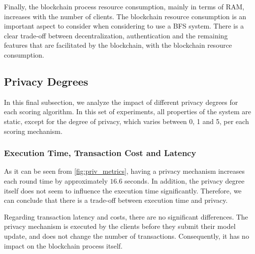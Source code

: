 Finally, the blockchain process resource consumption, mainly in terms of RAM, increases with the number of clients. The blockchain resource consumption is an important aspect to consider when considering to use a BFS system. There is a clear trade-off between decentralization, authentication and the remaining features that are facilitated by the blockchain, with the blockchain resource consumption.

\subsection{Privacy Degrees}

In this final subsection, we analyze the impact of different privacy degrees for each scoring algorithm. In this set of experiments, all properties of the system are static, except for the degree of privacy, which varies between 0, 1 and 5, per each scoring mechanism.

\subsubsection{Execution Time, Transaction Cost and Latency}

As it can be seen from \autoref{fig:priv_metrics}, having a privacy mechanism increases each round time by approximately $16.6$ seconds. In addition, the privacy degree itself does not seem to influence the execution time significantly. Therefore, we can conclude that there is a trade-off between execution time and privacy.

Regarding transaction latency and costs, there are no significant differences. The privacy mechanism is executed by the clients before they submit their model update, and does not change the number of transactions. Consequently, it has no impact on the blockchain process itself.


